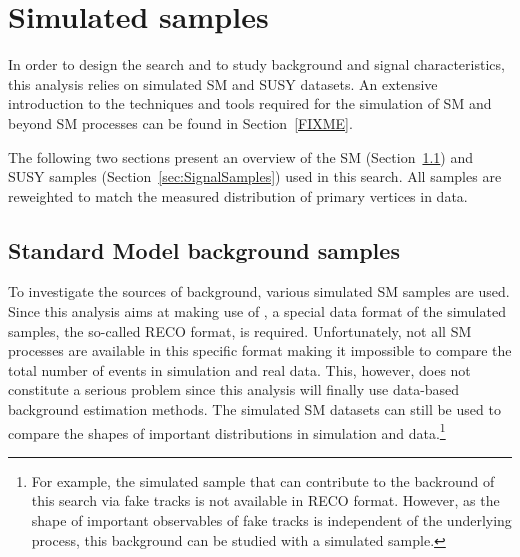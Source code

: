 \chapter{Simulated samples}
\label{sec:SimulatedSamples}

In order to design the search and to study background and signal characteristics, this analysis relies on simulated  SM and SUSY datasets.
An extensive introduction to the techniques and tools required for the simulation of SM and beyond SM processes can be found in Section~\ref{FIXME}.

The following two sections present an overview of the SM (Section~\ref{sec:SMSamples}) and SUSY samples (Section~\ref{sec:SignalSamples}) used in this search.
All samples are reweighted to match the measured distribution of primary vertices in data.

\section{Standard Model background samples}
\label{sec:SMSamples}
To investigate the sources of background, various simulated SM samples are used.
Since this analysis aims at making use of \dedx, a special data format of the simulated samples, the so-called RECO format, is required.
Unfortunately, not all SM processes are available in this specific format making it impossible to compare the total number of events in simulation and real data.
This, however, does not constitute a serious problem since this analysis will finally use data-based background estimation methods.
The simulated SM datasets can still be used to compare the shapes of important distributions in simulation and data.\footnote{For example, the simulated \ZInvJets sample that can contribute to the backround of this search via fake tracks is not available in RECO format. However, as the shape of important observables of fake tracks is independent of the underlying process, this background can be studied with a simulated \WJets sample.}

